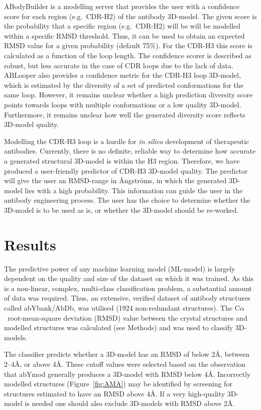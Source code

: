 \documentclass[12pt]{article}
\newcommand{\ca}{\mbox{C$\alpha$}}
\begin{document}
ABodyBuilder is a modelling server that provides the user with a
confidence score for each region (e.g.\ CDR-H2) of the antibody
3D-model. The given score is the probability that a specific region
(e.g.\ CDR-H2) will be will be modelled within a specific RMSD
threshold\cite{Leem2016}. Thus, it can be used to obtain an expected
RMSD value for a given probability (default 75\%). For the CDR-H3 this
score is calculated as a function of the loop length.  The confidence
scorer is described as robust, but less accurate in the case of CDR
loops due to the lack of data\cite{Leem2016}. ABLooper also provides a
confidence metric for the CDR-H3 loop 3D-model, which is estimated by the
diversity of a set of predicted conformations for the same
loop\cite{Abanades2022}. However, it remains unclear whether a high
prediction diversity score points towards loops with multiple
conformations or a low quality 3D-model. Furthermore, it remains unclear
how well the generated diversity score reflects 3D-model
quality\cite{Abanades2022}.


Modelling the CDR-H3 loop is a hurdle for \emph{in silico} development of
therapeutic antibodies. Currently, there is no definite, reliable way
to determine how accurate a generated structural 3D-model is within the
H3 region. Therefore, we have produced a
user-friendly predictor of CDR-H3 3D-model quality. The predictor will give
the user an RMSD-range in {\AA}ngstr\"{o}ms, in which the generated 3D-model lies
with a high probability.
This information can guide the
user in the antibody engineering process. The user has the choice to
determine whether the 3D-model is to be used as is, or
whether the 3D-model should be re-worked.

\section{Results}

The predictive power of any machine learning model (ML-model) is largely
dependent on the quality and size of the dataset on which it was trained. As
this is a non-linear, complex, multi-class classification problem, a
substantial amount of data was required. Thus, an extensive, verified
dataset of antibody structures called abYbank/AbDb\cite{Ferdous2018},
was utilised (1924 non-redundant
structures). The \ca\ root-mean-square deviation (RMSD) value
between the crystal structures
and modelled structures was calculated (see Methods) and
was used to classify 3D-models.

The classifier predicts whether a 3D-model has an RMSD of below 2\AA,
between 2--4\AA, or above 4\AA. These cutoff values were selected
based on the observation that abYmod generally produces a 3D-model with
RMSD below 4\AA. Incorrectly modelled structures (Figure~\ref{fig:AMA}) may
be identified by screening for structures estimated to have an RMSD
above 4\AA. If a very high-quality 3D-model is needed one should also
exclude 3D-models with RMSD above 2\AA.
\end{document}
